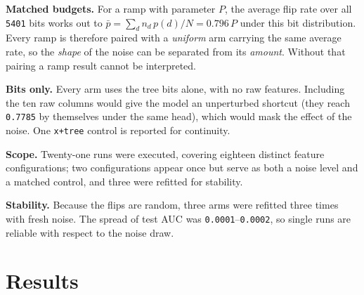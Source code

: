 \documentclass[11pt,a4paper]{article}
\newcommand{\num}[1]{\texttt{#1}}
\begin{document}
\noindent\textbf{Matched budgets.} For a ramp with parameter $P$, the average
flip rate over all \num{5401} bits works out to
$\bar p = \sum_d n_d\,p(d) / N = 0.796\,P$ under this bit distribution. Every
ramp is therefore paired with a \emph{uniform} arm carrying the same average
rate, so the \emph{shape} of the noise can be separated from its \emph{amount}.
Without that pairing a ramp result cannot be interpreted.

\noindent\textbf{Bits only.} Every arm uses the tree bits alone, with no raw
features. Including the ten raw columns would give the model an unperturbed
shortcut (they reach \num{0.7785} by themselves under the same head), which
would mask the effect of the noise. One \texttt{x+tree} control is reported for
continuity.

\noindent\textbf{Scope.} Twenty-one runs were executed, covering eighteen
distinct feature configurations; two configurations appear once but serve as both
a noise level and a matched control, and three were refitted for stability.

\noindent\textbf{Stability.} Because the flips are random, three arms were
refitted three times with fresh noise. The spread of test AUC was
\num{0.0001}--\num{0.0002}, so single runs are reliable with respect to the
noise draw.

\section{Results}
\end{document}
